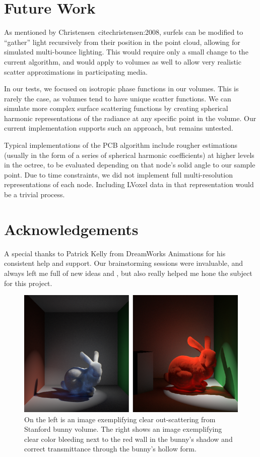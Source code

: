 \documentclass[runningheads]{llncs}
\begin{document}
\section{Future Work}


As mentioned by Christensen~cite{christensen:2008}, surfels can be modified to ``gather'' light recursively from their position in the point cloud, allowing for simulated multi-bounce lighting.  This would require only a small change to the current algorithm, and would apply to volumes as well to allow very realistic scatter approximations in participating media.

In our tests, we focused on isotropic phase functions in our volumes.  This is rarely the case, as volumes tend to have unique scatter functions.  We can simulate more complex surface scattering functions by creating spherical harmonic representations of the radiance at any specific point in the volume.  Our current implementation supports such an approach, but remains untested.

Typical implementations of the PCB algorithm include rougher estimations (usually in the form of a series of spherical harmonic coefficients) at higher levels in the octree, to be evaluated depending on that node's solid angle to our sample point.  Due to time constraints, we did not implement full multi-resolution representations of each node.  Including LVoxel data in that representation would be a trivial process.

\section*{Acknowledgements}
A special thanks to Patrick Kelly from DreamWorks Animations for his consistent help and support.  Our brainstorming sessions were invaluable, and always left me full of new ideas and , but also really helped me hone the subject for this project.




\begin{figure}[h!]
    \centering
   \includegraphics[width=140mm]{img/Two_Bunnies.png}
    \caption{On the left is  an image exemplifying clear out-scattering from Stanford bunny volume.  The right shows an image exemplifying clear color bleeding next to the red wall in the bunny's shadow and correct transmittance through the bunny's hollow form.}
\end{figure}
\end{document}
